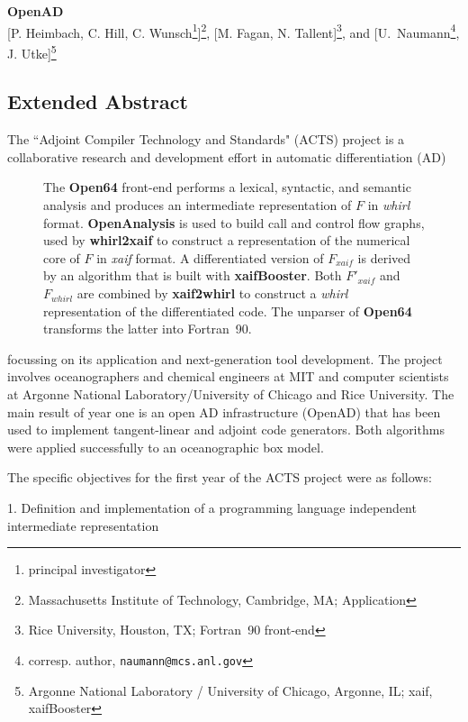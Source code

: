 \documentclass{article}
\begin{document}
\begin{center}
{\LARGE \bf OpenAD } \vspace{.2cm} \\

[P. Heimbach, C. Hill, C. Wunsch\footnote{principal investigator}]\footnote{Massachusetts Institute of Technology, Cambridge, MA; Application}, [M. Fagan, N. Tallent]\footnote{Rice University, Houston, TX; Fortran~90 front-end}, 
and [U.~Naumann\footnote{corresp. author, {\tt naumann@mcs.anl.gov}}, J. Utke]\footnote{Argonne National Laboratory / University of Chicago, Argonne, IL; xaif, xaifBooster}
\end{center}

\subsection*{Extended Abstract}

The ``Adjoint Compiler Technology and Standards" (ACTS)
project is a collaborative
research and development effort in automatic differentiation (AD)
\begin{wrapfigure}{r}{6cm}
\caption{The {\bf Open64} front-end performs a lexical, syntactic, and semantic analysis and produces an intermediate representation of $F$ in {\em whirl} format.
{\bf OpenAnalysis} is used to build call and control flow graphs, used by
{\bf whirl2xaif} to construct a representation of the numerical core of $F$ in
{\em xaif} format. A differentiated version of $F_{xaif}$ is derived by an 
algorithm that is built with {\bf xaifBooster}. Both  
$F'_{xaif}$ and $F_{whirl}$ are combined by {\bf xaif2whirl} to construct a 
{\em whirl} representation of the differentiated code. The unparser of 
{\bf Open64}
transforms the latter into Fortran~90. 
} \label{fig:overview}
\end{wrapfigure}
\cite{BBCG96,CFG+01,CG91,Gri00}
focussing on its application and next-generation tool development.
The project involves
oceanographers and chemical engineers at MIT and computer scientists 
at Argonne National Laboratory/University of Chicago and Rice University.
The main result of year one is an open AD 
infrastructure (OpenAD) that has been used to implement tangent-linear
and adjoint code generators. Both algorithms were applied successfully to an
oceanographic box model. 

The specific objectives for the first year of the ACTS project were
as follows:

1. Definition and implementation of a programming language independent 
intermediate representation
\end{document}
